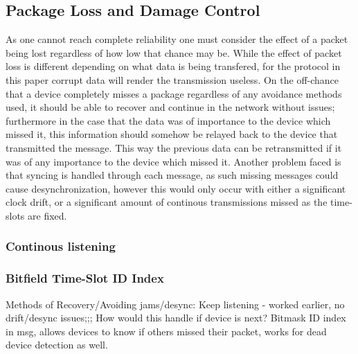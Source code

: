 \subsection{Package Loss and Damage Control}
As one cannot reach complete reliability one must consider the effect of a packet being lost regardless of how low that chance may be.
While the effect of packet loss is different depending on what data is being transfered, for the protocol in this paper corrupt data will render the transmission useless.
On the off-chance that a device completely misses a package regardless of any avoidance methods used, it should be able to recover and continue in the network without issues; furthermore in the case that the data was of importance to the device which missed it, this information should somehow be relayed back to the device that transmitted the message.
This way the previous data can be retransmitted if it was of any importance to the device which missed it.
Another problem faced is that syncing is handled through each message, as such missing messages could cause desynchronization, however this would only occur with either a significant clock drift, or a significant amount of continous transmissions missed as the time-slots are fixed. 

\subsubsection*{Continous listening}
\subsubsection*{Bitfield Time-Slot ID Index}

Methods of Recovery/Avoiding jams/desync:
Keep listening - worked earlier, no drift/desync issues;;; How would this handle if device is next?
Bitmask ID index in msg, allows devices to know if others missed their packet, works for dead device detection as well.
